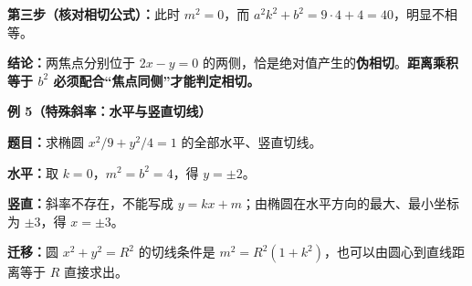 \begin{examplebox}
\textbf{第三步（核对相切公式）：}此时 $m^2=0$，而 $a^2k^2+b^2=9\cdot4+4=40$，明显不相等。

\textbf{结论：}两焦点分别位于 $2x-y=0$ 的两侧，恰是绝对值产生的\textbf{伪相切}。\textbf{距离乘积等于 $b^2$ 必须配合“焦点同侧”才能判定相切。}

\medskip
\textbf{\textcolor{CExample}{例 5（特殊斜率：水平与竖直切线）}}

\textbf{题目：}求椭圆 $x^2/9+y^2/4=1$ 的全部水平、竖直切线。

\textbf{水平：}取 $k=0$，$m^2=b^2=4$，得 $\boxed{y=\pm2}$。

\textbf{竖直：}斜率不存在，不能写成 $y=kx+m$；由椭圆在水平方向的最大、最小坐标为 $\pm3$，得 $\boxed{x=\pm3}$。

\textbf{迁移：}圆 $x^2+y^2=R^2$ 的切线条件是 $m^2=R^2(1+k^2)$，也可以由圆心到直线距离等于 $R$ 直接求出。
\end{examplebox}
